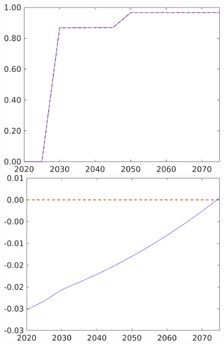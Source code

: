 \begin{figure}[h!!]
\begin{minipage}[]{0.32\textwidth}
	\end{minipage}
	\begin{minipage}[]{0.32\textwidth}
		\includegraphics[width=1\textwidth]{../../codding_model/own_basedOnFried/optimalPol_190722_tidiedUp/figures/all_July22/tauf_DDCompEffOPT_T_NoTaus_pol4_spillover0_noskill1_sep1_xgrowth0_etaa0.79_lgd0_lff0.png}
	\end{minipage}
\begin{minipage}[]{0.32\textwidth}
	\includegraphics[width=1\textwidth]{../../codding_model/own_basedOnFried/optimalPol_190722_tidiedUp/figures/all_July22/taul_DDCompEffOPT_T_NoTaus_pol4_spillover0_noskill1_sep1_xgrowth0_etaa0.79_lgd0_lff0.png}
\end{minipage}
\end{figure}

